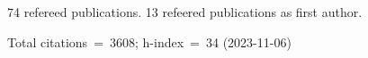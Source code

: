 74 refereed publications. 13 refeered publications as first author.

Total citations~=~3608; h-index~=~34 (2023-11-06)